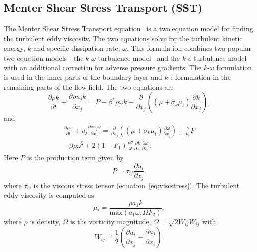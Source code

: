 \subsection{Menter Shear Stress Transport (SST)}
The Menter Shear Stress Transport equation~\cite{menter1994two} is a two equation model for finding the turbulent eddy viscosity. The two equations solve for the turbulent kinetic energy, $k$ and specific dissipation rate, $\omega$. This formulation combines two popular two equation models - the $k$-$\omega$ turbulence model~\cite{wilcox1988komega,wilcox2008komega} and the $k$-$\epsilon$ turbulence model~\cite{launder1974kepsilon,jones1972kepsilon} with an additional correction for adverse pressure gradients. The $k$-$\omega$ formulation is used in the inner parts of the boundary layer and $k$-$\epsilon$ formulation in the remaining parts of the flow field. 
The two equations are
\begin{equation}
\frac{\partial \rho k}{\partial t} + \frac{\partial \rho u_j k}{\partial x_j} = P - \beta^* \rho\omega k + \frac{\partial}{\partial x_j}\left((\mu + \sigma_k \mu_t)\frac{\partial k}{\partial x_j} \right),
\label{eq:keqn}
\end{equation}
and
\begin{align}
\frac{\partial \rho\omega}{\partial t} + u_j\frac{\partial \rho u_j \omega}{\partial x_j} = \frac{\partial}{\partial x_j}\left((\mu + \sigma_k \mu_t)\frac{\partial \omega}{\partial x_j} \right) + \frac{\gamma}{\nu_t}P \\ -\beta \rho \omega^2 + 2(1-F_1)\frac{\rho\sigma}{\omega}{\frac{\partial k}{\partial x_i}}{\frac{\partial \omega}{\partial x_i}}.
\label{eq:omeqn}
\end{align}
Here $P$ is the production term given by
\begin{equation}
P = \tau_{ij} \frac{\partial u_i}{\partial x_j}.
\end{equation}
where $\tau_{ij}$ is the viscous stress tensor (equation~\ref{eq:viscstress}). The turbulent eddy viscosity is computed as
\begin{equation}
    \mu_t = \frac{\rho a_1 k}{\text{max}(a_1 \omega, \Omega F_2)},
    \label{eq:kweddyvisc}
\end{equation}{}
where $\rho$ is density, $\Omega$ is the vorticity magnitude, $\Omega = \sqrt{2W_{ij}W_{ij}}$ with 
\begin{equation*}
    W_{ij} = \frac{1}{2}\left(\frac{\partial u_i}{\partial x_j} - \frac{\partial u_j}{\partial x_i} \right).
\end{equation*}{} 
